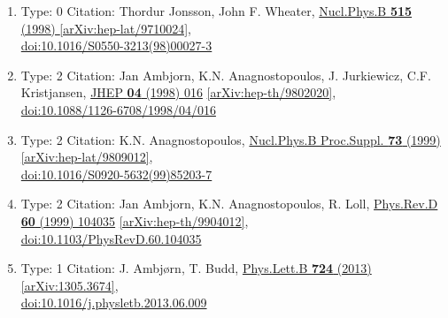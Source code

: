 \documentclass[a4paper,10pt]{article}
\begin{document}
\begin{enumerate}
\begin{enumerate}
  \item Type: 0 Citation: Thordur Jonsson, John F. Wheater, \href{https://www.doi.org/10.1016/S0550-3213(98)00027-3}{Nucl.Phys.B {\bf 515} (1998) }  \href{https://arxiv.org/abs/hep-lat/9710024}{[arXiv:hep-lat/9710024]},\\\href{https://www.doi.org/10.1016/S0550-3213(98)00027-3}{doi:10.1016/S0550-3213(98)00027-3}
  \item Type: 2 Citation: Jan Ambjorn, K.N. Anagnostopoulos, J. Jurkiewicz, C.F. Kristjansen, \href{https://www.doi.org/10.1088/1126-6708/1998/04/016}{JHEP {\bf 04} (1998) 016}  \href{https://arxiv.org/abs/hep-th/9802020}{[arXiv:hep-th/9802020]},\\\href{https://www.doi.org/10.1088/1126-6708/1998/04/016}{doi:10.1088/1126-6708/1998/04/016}
  \item Type: 2 Citation: K.N. Anagnostopoulos, \href{https://www.doi.org/10.1016/S0920-5632(99)85203-7}{Nucl.Phys.B Proc.Suppl. {\bf 73} (1999) }  \href{https://arxiv.org/abs/hep-lat/9809012}{[arXiv:hep-lat/9809012]},\\\href{https://www.doi.org/10.1016/S0920-5632(99)85203-7}{doi:10.1016/S0920-5632(99)85203-7}
  \item Type: 2 Citation: Jan Ambjorn, K.N. Anagnostopoulos, R. Loll, \href{https://www.doi.org/10.1103/PhysRevD.60.104035}{Phys.Rev.D {\bf 60} (1999) 104035}  \href{https://arxiv.org/abs/hep-th/9904012}{[arXiv:hep-th/9904012]},\\\href{https://www.doi.org/10.1103/PhysRevD.60.104035}{doi:10.1103/PhysRevD.60.104035}
  \item Type: 1 Citation: J. Ambjørn, T. Budd, \href{https://www.doi.org/10.1016/j.physletb.2013.06.009}{Phys.Lett.B {\bf 724} (2013) }  \href{https://arxiv.org/abs/1305.3674}{[arXiv:1305.3674]},\\\href{https://www.doi.org/10.1016/j.physletb.2013.06.009}{doi:10.1016/j.physletb.2013.06.009}

\end{enumerate}
\end{enumerate}
\end{document}

